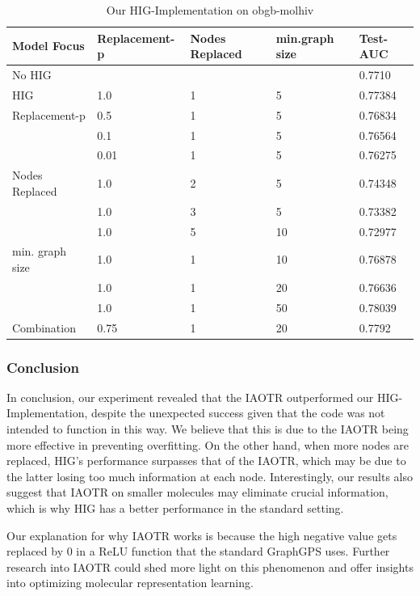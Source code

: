 \begin{table}[ht!]
    \centering
    \begin{tabular}{@{}lllll@{}}
        \toprule
        Model Focus     & Replacement-p & Nodes Replaced & min.graph size & Test-AUC \\ \midrule
        No HIG          &               &                &                & 0.7710   \\
        HIG             & 1.0           & 1              & 5              & 0.77384  \\
        Replacement-p   & 0.5           & 1              & 5              & 0.76834  \\
                        & 0.1           & 1              & 5              & 0.76564  \\
                        & 0.01          & 1              & 5              & 0.76275  \\
        Nodes Replaced  & 1.0           & 2              & 5              & 0.74348  \\
                        & 1.0           & 3              & 5              & 0.73382  \\
                        & 1.0           & 5              & 10             & 0.72977  \\
        min. graph size & 1.0           & 1              & 10             & 0.76878  \\
                        & 1.0           & 1              & 20             & 0.76636  \\
                        & 1.0           & 1              & 50             & 0.78039  \\
        Combination     & 0.75          & 1              & 20             & 0.7792   \\ \bottomrule
    \end{tabular}
    \caption{Our HIG-Implementation on obgb-molhiv}
    \label{table:hig_results}
\end{table}

\subsubsection{Conclusion}
In conclusion, our experiment revealed that the IAOTR outperformed our HIG-Implementation, despite the unexpected success given that the code was not intended to function in this way. We believe that this is due to the IAOTR  being more effective in preventing overfitting. On the other hand, when more nodes are replaced, HIG's performance surpasses that of the IAOTR, which may be due to the latter losing too much information at each node. Interestingly, our results also suggest that IAOTR on smaller molecules may eliminate crucial information, which is why HIG has a better performance in the standard setting.

Our explanation for why IAOTR works is because the high negative value gets replaced by 0 in a ReLU function that the standard GraphGPS \cite{2023graphgps} uses.
Further research into IAOTR could shed more light on this phenomenon and offer insights into optimizing molecular representation learning.
